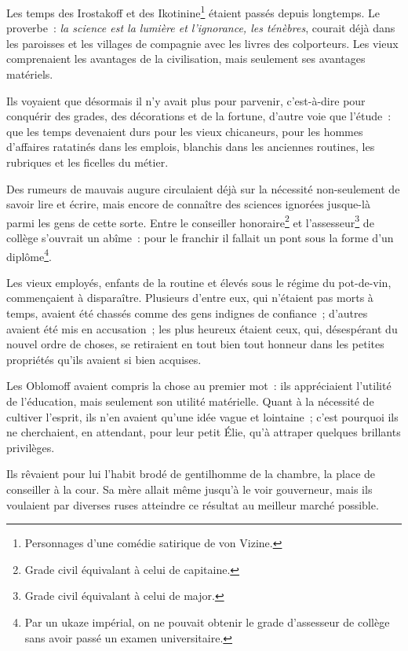 \documentclass[french,twoside]{book} %
\begin{document}
Les temps des Irostakoff et des Ikotinine\footnote{Personnages d’une comédie satirique de von Vizine.} étaient passés depuis longtemps. Le proverbe : \emph{la science est la lumière et l’ignorance, les ténèbres}, courait déjà dans les paroisses et les villages de compagnie avec les livres des colporteurs. Les vieux comprenaient les avantages de la civilisation, mais seulement ses avantages matériels.\par
Ils voyaient que désormais il n’y avait plus pour parvenir, c’est-à-dire pour conquérir des grades, des décorations et de la fortune, d’autre voie que l’étude : que les temps devenaient durs pour les vieux chicaneurs, pour les hommes d’affaires ratatinés dans les emplois, blanchis dans les anciennes routines, les rubriques et les ficelles du métier.\par
Des rumeurs de mauvais augure circulaient déjà sur la nécessité non-seulement de savoir lire et écrire, mais encore de connaître des sciences ignorées jusque-là parmi les gens de cette sorte. Entre le conseiller honoraire\footnote{Grade civil équivalant à celui de capitaine.} et l’assesseur\footnote{Grade civil équivalant à celui de major.} de collège s’ouvrait un abîme : pour le franchir il fallait un pont sous la forme d’un diplôme\footnote{Par un ukaze impérial, on ne pouvait obtenir le grade d’assesseur de collège sans avoir passé un examen universitaire.}.\par
Les vieux employés, enfants de la routine et élevés sous le régime du pot-de-vin, commençaient à disparaître. Plusieurs d’entre eux, qui n’étaient pas morts à temps, avaient été chassés comme des gens indignes de confiance ; d’autres avaient été mis en accusation ; les plus heureux étaient ceux, qui, désespérant du nouvel ordre de choses, se retiraient en tout bien tout honneur dans les petites propriétés qu’ils avaient si bien acquises.\par
Les Oblomoff avaient compris la chose au premier mot : ils appréciaient l’utilité de l’éducation, mais seulement son utilité matérielle. Quant à la nécessité de cultiver l’esprit, ils n’en avaient qu’une idée vague et lointaine ; c’est pourquoi ils ne cherchaient, en attendant, pour leur petit Élie, qu’à attraper quelques brillants privilèges.\par
Ils rêvaient pour lui l’habit brodé de gentilhomme de la chambre, la place de conseiller à la cour. Sa mère allait même jusqu’à le voir gouverneur, mais ils voulaient par diverses ruses atteindre ce résultat au meilleur marché possible.\par
\end{document}
